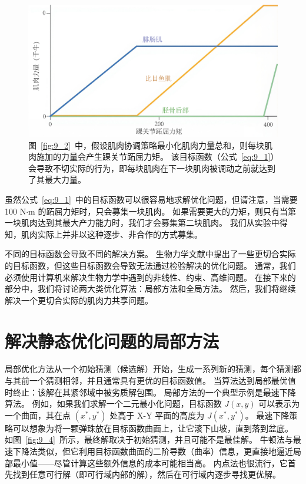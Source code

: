 \begin{figure}[!htb]
	\centering
	\includegraphics[width=0.75\linewidth]{chap9/9_3}
	\caption{图~\ref{fig:9_2}~中，假设肌肉协调策略最小化肌肉力量总和，则每块肌肉施加的力量会产生踝关节跖屈力矩。
		该目标函数（公式~\ref{eq:9_1}）会导致不切实际的行为，即每块肌肉在下一块肌肉被调动之前就达到了其最大力量。 \label{fig:9_3}}
\end{figure}


虽然公式~\ref{eq:9_1}~中的目标函数可以很容易地求解优化问题，但请注意，当需要 100 N$\cdot$m 的跖屈力矩时，只会募集一块肌肉。
如果需要更大的力矩，则只有当第一块肌肉达到其最大产力能力时，我们才会募集第二块肌肉。
我们从实验中得知，肌肉实际上并非以这种逐步、非合作的方式募集。


不同的目标函数会导致不同的解决方案。
生物力学文献中提出了一些更切合实际的目标函数，但这些目标函数会导致无法通过检验解决的优化问题。
通常，我们必须使用计算机来解决生物力学中遇到的非线性、约束、高维问题。
在接下来的部分中，我们将讨论两大类优化算法：局部方法和全局方法。
然后，我们将继续解决一个更切合实际的肌肉力共享问题。



\section{解决静态优化问题的局部方法}

局部优化方法从一个初始猜测（候选解）开始，生成一系列新的猜测，每个猜测都与其前一个猜测相邻，并且通常具有更优的目标函数值。
当算法达到局部最优值时终止：该解在其紧邻域中被劣质解包围。
局部方法的一个典型示例是最速下降算法。
例如，如果我们求解一个二元最小化问题，目标函数 $J(x,y)$ 可以表示为一个曲面，其在点 $(x^*,y^*)$ 处高于 X-Y 平面的高度为 $J(x^*,y^*)$。
最速下降策略可以想象为将一颗弹珠放在目标函数曲面上，让它滚下山坡，直到落到盆底。
如图~\ref{fig:9_4}~所示，最终解取决于初始猜测，并且可能不是最佳解。
牛顿法与最速下降法类似，但它利用目标函数曲面的二阶导数（曲率）信息，更直接地逼近局部最小值——尽管计算这些额外信息的成本可能相当高。
内点法也很流行，它首先找到任意可行解（即可行域内部的解），然后在可行域内逐步寻找更优解。


